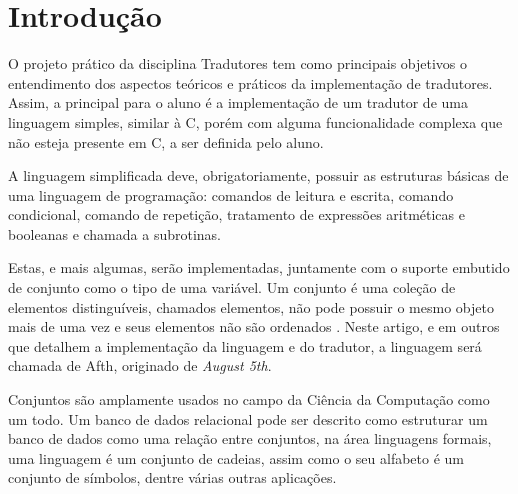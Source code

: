 \documentclass[
	article,			%
	11pt,				%
	oneside,			%
	a4paper,			%
	english,			%
	brazil,				%
	sumario=tradicional
	]{abntex2}
\begin{document}

\begin{center}\smaller
	
	
\end{center}

\textual

\section{Introdução}

O projeto prático da disciplina Tradutores tem como principais objetivos o entendimento
dos aspectos teóricos e práticos da implementação de tradutores. Assim, a principal
para o aluno é a implementação de um tradutor de uma linguagem simples, similar à C,
porém com alguma funcionalidade complexa que não esteja presente em C,
a ser definida pelo aluno.

A linguagem simplificada deve, obrigatoriamente, possuir as estruturas básicas de uma
linguagem de programação: comandos de leitura e escrita, comando condicional,
comando de repetição, tratamento de expressões aritméticas e booleanas e chamada a
subrotinas.

Estas, e mais algumas, serão implementadas, juntamente com o suporte embutido de conjunto
como o tipo de uma variável. Um conjunto é uma coleção de elementos distinguíveis, chamados
elementos, não pode possuir o mesmo objeto mais de uma vez e seus elementos não são ordenados
\cite[Apêndice B.1]{Cormen:2009:IAT:1614191}. Neste artigo, e em outros que detalhem a implementação da linguagem e do tradutor, a linguagem
será chamada de Afth, originado de \textit{August 5th}.

Conjuntos são amplamente usados no campo da Ciência da Computação
como um todo. Um banco de dados relacional pode ser descrito como estruturar um banco de dados
como uma relação entre conjuntos, na área linguagens formais, uma linguagem é um conjunto de
cadeias, assim como o seu alfabeto é um conjunto de símbolos, dentre várias outras aplicações.

\end{document}
